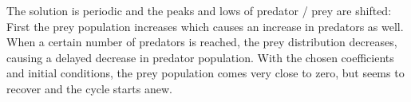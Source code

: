 The solution is periodic and the peaks and lows of predator / prey are shifted: First the prey population increases which causes an increase in predators as well. When a certain number of predators is reached, the prey distribution decreases, causing a delayed decrease in predator population. With the chosen coefficients and initial conditions, the prey population comes very close to zero, but seems to recover and the cycle starts anew.

